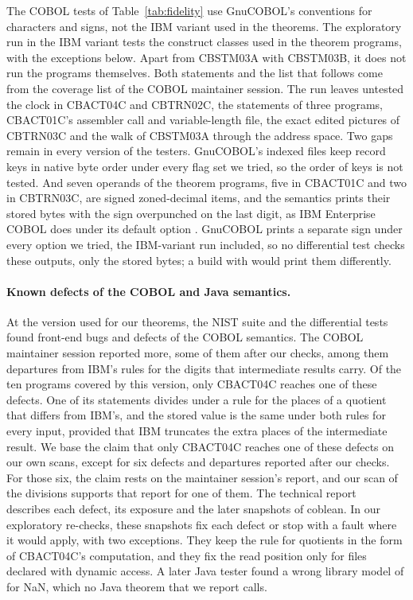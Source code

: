 The COBOL tests of Table~\ref{tab:fidelity} use GnuCOBOL's conventions for characters and signs, not the IBM variant used in the theorems. The exploratory run in the IBM variant tests the construct classes used in the theorem programs, with the exceptions below. Apart from CBSTM03A with CBSTM03B, it does not run the programs themselves. Both statements and the list that follows come from the coverage list of the COBOL maintainer session. The run leaves untested the clock in CBACT04C and CBTRN02C, the  statements of three programs, CBACT01C's
assembler call and variable-length file, the exact edited pictures of CBTRN03C and the walk of CBSTM03A through the
address space. Two gaps remain in every version of the testers. GnuCOBOL's indexed files keep record keys in native
byte order under every flag set we tried, so the order of keys is not tested. And seven  operands of the
theorem programs, five in CBACT01C and two in CBTRN03C, are signed zoned-decimal items, and the semantics prints their stored bytes with the sign overpunched on the last
digit, as IBM Enterprise COBOL does under its default option
. GnuCOBOL prints a separate sign under every option we tried, the IBM-variant run included, so
no differential test checks these outputs, only the stored bytes; a build with  would print them
differently.

\paragraph{Known defects of the COBOL and Java semantics.} At the version used for our theorems, the NIST suite and the
differential tests found front-end bugs and defects of the COBOL semantics. The COBOL maintainer session reported more,
some of them after our checks, among them departures from IBM's rules for the digits that intermediate results carry.
Of the ten programs covered by this version, only CBACT04C reaches one of these defects. One of its statements
divides under a rule for the places of a quotient that differs from IBM's, and the stored value is the same under both
rules for every input, provided that IBM truncates the extra places of the intermediate result. We base the claim that only CBACT04C reaches one of these defects on our own scans, except for six defects and
departures reported after our checks. For those six, the claim rests on the maintainer session's report, and our scan
of the divisions supports that report for one of them. The technical
report~\cite{fvtechreport} describes each defect, its exposure and the later snapshots of coblean. In our exploratory re-checks,
these snapshots fix each defect or stop with a fault where it would apply, with two exceptions. They keep the rule for quotients in
the form of CBACT04C's computation, and they fix the read position only for files declared with dynamic access. A later Java tester found a wrong
library model of  for NaN, which no Java theorem that we report calls.

